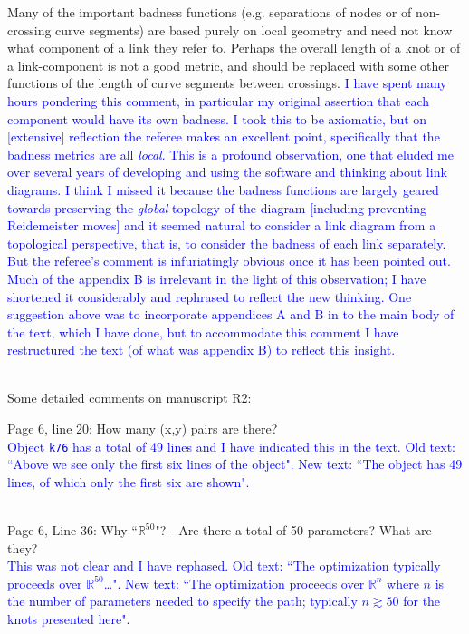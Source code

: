 \documentclass[12pt]{article}
\begin{document}
Many of the important badness functions (e.g. separations of nodes or
of non-crossing curve segments) are based purely on local geometry and
need not know what component of a link they refer to.  Perhaps the
overall length of a knot or of a link-component is not a good metric,
and should be replaced with some other functions of the length of
curve segments between crossings.  \textcolor{blue}{I have spent many
  hours pondering this comment, in particular my original assertion
  that each component would have its own badness.  I took this to be
  axiomatic, but on [extensive] reflection the referee makes an
  excellent point, specifically that the badness metrics are all {\em
    local}.  This is a profound observation, one that eluded me over
  several years of developing and using the software and thinking
  about link diagrams.  I think I missed it because the badness
  functions are largely geared towards preserving the {\em global}
  topology of the diagram [including preventing Reidemeister moves]
  and it seemed natural to consider a link diagram from a topological
  perspective, that is, to consider the badness of each link
  separately.  But the referee's comment is infuriatingly obvious once
  it has been pointed out.  Much of the appendix B is irrelevant in
  the light of this observation; I have shortened it considerably and
  rephrased to reflect the new thinking.  One suggestion above was to
  incorporate appendices A and B in to the main body of the text,
  which I have done, but to accommodate this comment I have
  restructured the text (of what was appendix B) to reflect this
  insight.\\ \\}

Some detailed comments on manuscript R2:

Page 6, line 20: How many (x,y) pairs are there?
\textcolor{blue}{\\Object {\tt k76} has a total of 49 lines and I have
  indicated this in the text.  Old text: ``Above we see only the first
  six lines of the object".  New text: ``The object has 49 lines, of
  which only the first six are shown".\\ \\}

Page 6, Line 36: Why ``$\mathbb{R}^{50}$"? - Are there a total of 50
parameters?  What are they?  \textcolor{blue}{\\This was not clear and
  I have rephased.  Old text: ``The optimization typically proceeds
  over $\mathbb{R}^{50}$\ldots". New text: ``The optimization
  proceeds over $\mathbb{R}^n$ where $n$ is the number of parameters
  needed to specify the path; typically $n\gtrsim 50$ for the knots
  presented here".\\ \\}
\end{document}
